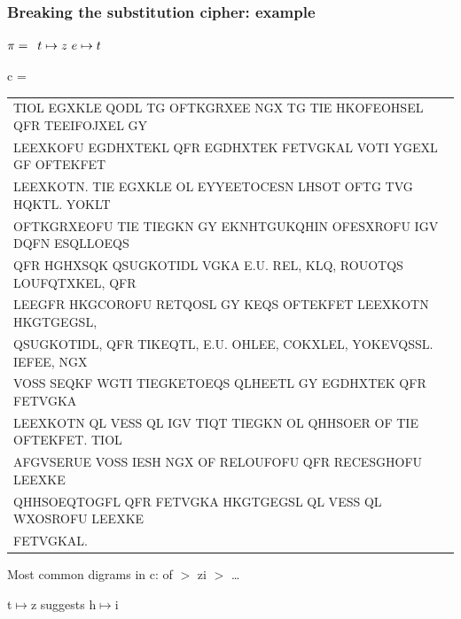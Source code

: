 \documentclass[aspectratio=169, lualatex, handout, 10pt,dvipsnames,svgnames]{beamer} %
\def\enbleu#1{\textcolor{bleu}{#1}}
\def\enrouge#1{\textcolor{rouge}{#1}}
\begin{document}
\begin{frame}
  \frametitle{Breaking the substitution cipher: example}

    \enrouge{
    \tiny{$\pi=
      \begin{array}[t]{l}
      t\mapsto z\ e\mapsto t\
      \end{array}
      $}}
  \vspace{0.25cm}
  
  \color{vert}
  \tiny{c =
    \begin{tabular}[t]{l}
      \enbleu{T}IOL EGXKL\enbleu{E} QODL \enbleu{T}G OF\enbleu{T}KGRXE\enbleu{E} NGX \enbleu{T}G \enbleu{T}I\enbleu{E} HKOFEOHS\enbleu{E}L QFR \enbleu{T}\enbleu{E}EIFOJX\enbleu{E}L GY \\
      L\enbleu{E}EXKOFU EGDHX\enbleu{T}\enbleu{E}KL QFR EGDHX\enbleu{T}\enbleu{E}K F\enbleu{E}\enbleu{T}VGKAL VO\enbleu{T}I YGEXL GF OF\enbleu{T}\enbleu{E}KF\enbleu{E}\enbleu{T} \\
      L\enbleu{E}EXKO\enbleu{T}N. \enbleu{T}I\enbleu{E} EGXKL\enbleu{E} OL \enbleu{E}YY\enbleu{E}E\enbleu{T}OC\enbleu{E}SN LHSO\enbleu{T} OF\enbleu{T}G \enbleu{T}VG HQK\enbleu{T}L. YOKL\enbleu{T} \\
      OF\enbleu{T}KGRXEOFU \enbleu{T}I\enbleu{E} \enbleu{T}I\enbleu{E}GKN GY EKNH\enbleu{T}GUKQHIN OFESXROFU IGV DQFN ESQLLOEQS \\
      QFR HGHXSQK QSUGKO\enbleu{T}IDL VGKA \enbleu{E}.U. R\enbleu{E}L, KLQ, ROUO\enbleu{T}QS LOUFQ\enbleu{T}XK\enbleu{E}L, QFR \\
      L\enbleu{E}EGFR HKGCOROFU R\enbleu{E}\enbleu{T}QOSL GY K\enbleu{E}QS OF\enbleu{T}\enbleu{E}KF\enbleu{E}\enbleu{T} L\enbleu{E}EXKO\enbleu{T}N HKG\enbleu{T}GEGSL, \\
      QSUGKO\enbleu{T}IDL, QFR \enbleu{T}IK\enbleu{E}Q\enbleu{T}L, \enbleu{E}.U. OHL\enbleu{E}E, COKXL\enbleu{E}L, YOK\enbleu{E}VQSSL. I\enbleu{E}FE\enbleu{E}, NGX \\
      VOSS S\enbleu{E}QKF WG\enbleu{T}I \enbleu{T}I\enbleu{E}GK\enbleu{E}\enbleu{T}OEQS QLH\enbleu{E}E\enbleu{T}L GY EGDHX\enbleu{T}\enbleu{E}K QFR F\enbleu{E}\enbleu{T}VGKA \\
      L\enbleu{E}EXKO\enbleu{T}N QL V\enbleu{E}SS QL IGV \enbleu{T}IQ\enbleu{T} \enbleu{T}I\enbleu{E}GKN OL QHHSO\enbleu{E}R OF \enbleu{T}I\enbleu{E} OF\enbleu{T}\enbleu{E}KF\enbleu{E}\enbleu{T}. \enbleu{T}IOL \\
      AFGVS\enbleu{E}RU\enbleu{E} VOSS I\enbleu{E}SH NGX OF R\enbleu{E}LOUFOFU QFR R\enbleu{E}C\enbleu{E}SGHOFU L\enbleu{E}EXK\enbleu{E} \\
      QHHSOEQ\enbleu{T}OGFL QFR F\enbleu{E}\enbleu{T}VGKA HKG\enbleu{T}GEGSL QL V\enbleu{E}SS QL WXOSROFU L\enbleu{E}EXK\enbleu{E} \\
      F\enbleu{E}\enbleu{T}VGKAL.
    \end{tabular}
  }
  \vspace{0.5cm}

  \normalsize
  \color{black}Most common digrams in c: of $>$ zi $>$ \dots
  
  \pause

  t$\mapsto$z suggests h$\mapsto$i

  \color{black}
\end{frame}
\end{document}
